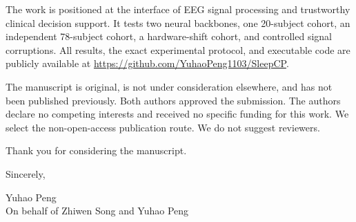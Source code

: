 \documentclass[10pt]{letter}
\begin{document}
The work is positioned at the interface of EEG signal processing and
trustworthy clinical decision support. It tests two neural backbones, one
20-subject cohort, an independent 78-subject cohort, a hardware-shift cohort,
and controlled signal corruptions. All results, the exact experimental
protocol, and executable code are publicly available at
\url{https://github.com/YuhaoPeng1103/SleepCP}.

The manuscript is original, is not under consideration elsewhere, and has not
been published previously. Both authors approved the submission. The authors
declare no competing interests and received no specific funding for this
work. We select the non-open-access publication route. We do not suggest
reviewers.

Thank you for considering the manuscript.

\vspace{1.5em}
Sincerely,

\vspace{1.5em}
Yuhao Peng\\
On behalf of Zhiwen Song and Yuhao Peng
\end{document}

